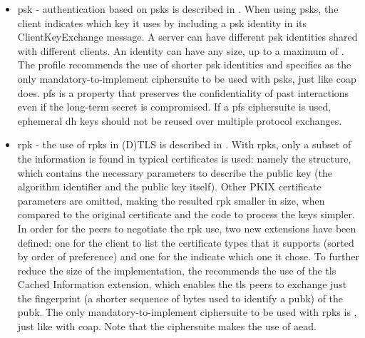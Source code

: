 \documentclass{llncs}
\begin{document}
\begin{itemize}
  \item \gls{psk} - authentication based on \gls{psk}s is described in
  \cite{RFC4279}. When using \gls{psk}s, the client indicates which
  key it uses by including a \gls{psk} identity in its ClientKeyExchange message.
  A server can have different \gls{psk} identities shared with different clients.
  An identity can have any size, up to a maximum of .
  The profile recommends the use of shorter \gls{psk} identities and specifies
   as the only mandatory-to-implement
  ciphersuite to be used with \gls{psk}s, just like \gls{coap} does. \gls{pfs} is
  a property that preserves the confidentiality of past interactions even if the
  long-term secret is compromised. If a \gls{pfs} ciphersuite is used, ephemeral
  \gls{dh} keys should not be reused over multiple protocol exchanges.

  \item \gls{rpk} - the use of \gls{rpk}s in (D)TLS is described in \cite{RFC7250}.
  With \gls{rpk}s, only a subset of the information is found in typical certificates
  is used: namely the  structure, which contains
  the necessary parameters to describe the public key (the algorithm identifier
  and the public key itself). Other PKIX certificate\cite{RFCabc} parameters are
  omitted, making the resulted \gls{rpk} smaller in size, when compared to the
  original certificate and the code to process the keys simpler. In order for the
  peers to negotiate the \gls{rpk} use, two new extensions have been defined:
  one for the client to list the certificate types that it supports (sorted by order of preference) and one for
  the indicate which one it chose. To further reduce the size of the implementation, the 
  recommends the use of the \gls{tls} Cached Information extension\cite{RFC7924}, which
  enables the \gls{tls} peers to exchange just the fingerprint (a shorter sequence of bytes
  used to identify a \gls{pubk}) of the \gls{pubk}. The only mandatory-to-implement
  ciphersuite to be used with \gls{rpk}s is ,
  just like with \gls{coap}. Note that the ciphersuite makes the use of \gls{aead}.


\end{itemize}
\end{document}
